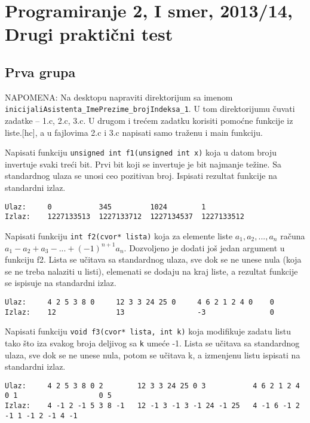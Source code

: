 \section{Programiranje 2, I smer, 2013/14, Drugi prakti\v cni test}

\subsection{Prva grupa}

NAPOMENA: Na desktopu napraviti direktorijum sa imenom
\verb|inicijaliAsistenta_ImePrezime_brojIndeksa_1|.  U tom
direktorijumu \v cuvati zadatke -- 1.c, 2.c, 3.c. U drugom i tre\' cem
zadatku korisiti pomo\' cne funkcije iz liste.[hc], a u fajlovima 2.c
i 3.c napisati samo tra\v zenu i main funkciju.

\setcounter{z}{0}

\begin{z}
  Napisati funkciju {\tt unsigned int f1(unsigned int x)} koja u datom
  broju invertuje svaki tre\'ci bit. Prvi bit koji se invertuje je bit
  najmanje te\v zine.  Sa standardnog ulaza se unosi ceo pozitivan
  broj. Ispisati rezultat funkcije na standardni izlaz.
\end{z}
\begin{verbatim}
Ulaz:     0           345         1024        1
Izlaz:    1227133513  1227133712  1227134537  1227133512
\end{verbatim}

\begin{z}
  Napisati funkciju {\tt int f2(cvor* lista)} koja za elemente liste
  $a_1, a_2, ..., a_n$ ra\v cuna $a_1 - a_2 + a_3 - ... +
  (-1)^{n+1}a_n$. Dozvoljeno je dodati jo\v s jedan argument u
  funkciju f2.  Lista se u\v citava sa standardnog ulaza, sve dok se
  ne unese nula (koja se ne treba nalaziti u listi), elemenati se
  dodaju na kraj liste, a rezultat funkcije se ispisuje na standardni
  izlaz.
\end{z}

\begin{verbatim}
Ulaz:     4 2 5 3 8 0     12 3 3 24 25 0     4 6 2 1 2 4 0    0
Izlaz:    12              13                 -3               0
\end{verbatim}

\begin{z}
  Napisati funkciju {\tt void f3(cvor* lista, int k)} koja modifikuje
  zadatu listu tako \v sto iza svakog broja deljivog sa {\tt k}
  ume\'ce -1. Lista se u\v citava sa standardnog ulaza, sve dok se ne
  unese nula, potom se u\v citava k, a izmenjenu listu ispisati na
  standardni izlaz.
\end{z}
\begin{verbatim}
Ulaz:     4 2 5 3 8 0 2        12 3 3 24 25 0 3           4 6 2 1 2 4 0 1                   0 5
Izlaz:    4 -1 2 -1 5 3 8 -1   12 -1 3 -1 3 -1 24 -1 25   4 -1 6 -1 2 -1 1 -1 2 -1 4 -1
\end{verbatim}


